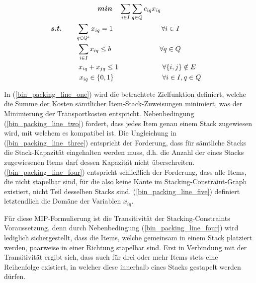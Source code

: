\vfill
\pagebreak

\begin{gather}
\boldsymbol{min} \quad \sum_{i \in I} \sum_{q \in Q} c_{iq} x_{iq} \label{bin_packing_line_one} \\
\thinspace\thinspace \boldsymbol{s.t.} \quad \quad \sum_{q \in Q^i} x_{iq} = 1 \quad\quad\quad\quad\quad\quad\quad \forall i \in I \quad\quad\quad\quad\thinspace\thinspace \label{bin_packing_line_two} \\
\thinspace \sum_{i \in I} x_{iq} \leq b \quad\quad\quad\quad\quad\quad\quad \forall q \in Q \label{bin_packing_line_three} \\
\thinspace\thinspace\quad\quad x_{iq} + x_{jq} \leq 1 \quad\quad\thinspace\thinspace\quad\quad\quad\quad \forall \{i, j\} \notin E \label{bin_packing_line_four} \\
\thinspace\thinspace\quad\quad\quad x_{iq} \in \{0, 1\} \thinspace\thinspace\thinspace\thinspace\thinspace\thinspace\quad\quad\quad\quad\quad\quad \forall i \in I, q \in Q \thinspace \label{bin_packing_line_five}
\end{gather}

In (\ref{bin_packing_line_one}) wird die betrachtete Zielfunktion definiert, welche die Summe der Kosten sämtlicher
Item-Stack-Zuweisungen minimiert, was der Minimierung der Transportkosten entspricht.
Nebenbedingung (\ref{bin_packing_line_two}) fordert, dass jedes Item genau einem Stack zugewiesen wird, mit welchem es kompatibel ist.
Die Ungleichung in (\ref{bin_packing_line_three}) entspricht der Forderung, dass für sämtliche Stacks die Stack-Kapazität eingehalten werden muss, d.h.
die Anzahl der eines Stacks zugewiesenen Items darf dessen Kapazität nicht überschreiten. (\ref{bin_packing_line_four}) entspricht schließlich der Forderung, dass alle Items, die nicht stapelbar sind, für die also keine Kante im Stacking-Constraint-Graph existiert, nicht Teil desselben Stacks sind. (\ref{bin_packing_line_five}) definiert letztendlich die Domäne der Variablen $x_{iq}$.

Für diese MIP-Formulierung ist die Transitivität der Stacking-Constraints Voraussetzung, denn durch Nebenbedingung (\ref{bin_packing_line_four}) wird lediglich sichergestellt, dass die Items, welche gemeinsam in einem Stack platziert werden,
paarweise in einer Richtung stapelbar sind. Erst in Verbindung mit der Transitivität ergibt sich, dass auch für drei oder
mehr Items stets eine Reihenfolge existiert, in welcher diese innerhalb eines Stacks gestapelt werden dürfen.

